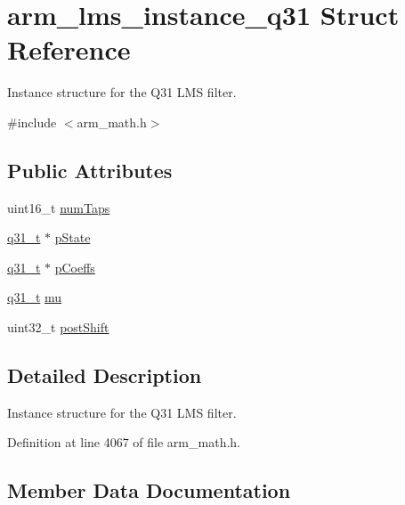 \hypertarget{structarm__lms__instance__q31}{}\section{arm\+\_\+lms\+\_\+instance\+\_\+q31 Struct Reference}
\label{structarm__lms__instance__q31}


Instance structure for the Q31 L\+MS filter.  




{\ttfamily \#include $<$arm\+\_\+math.\+h$>$}

\subsection*{Public Attributes}
\begin{DoxyCompactItemize}
\item 
uint16\+\_\+t \hyperlink{structarm__lms__instance__q31_ac0d84f7d054555931ef8a62511fbcb8a}{num\+Taps}
\item 
\hyperlink{arm__math_8h_adc89a3547f5324b7b3b95adec3806bc0}{q31\+\_\+t} $\ast$ \hyperlink{structarm__lms__instance__q31_a206d47b49de6f357f933ebe61520753c}{p\+State}
\item 
\hyperlink{arm__math_8h_adc89a3547f5324b7b3b95adec3806bc0}{q31\+\_\+t} $\ast$ \hyperlink{structarm__lms__instance__q31_a4afe56e991a5416adfd462aa88bda500}{p\+Coeffs}
\item 
\hyperlink{arm__math_8h_adc89a3547f5324b7b3b95adec3806bc0}{q31\+\_\+t} \hyperlink{structarm__lms__instance__q31_acb6ca9996b3c5f740d5d6c8e9f4f1d46}{mu}
\item 
uint32\+\_\+t \hyperlink{structarm__lms__instance__q31_a4705a8f0011bb9166e09bf5bd51e595e}{post\+Shift}
\end{DoxyCompactItemize}


\subsection{Detailed Description}
Instance structure for the Q31 L\+MS filter. 

Definition at line 4067 of file arm\+\_\+math.\+h.



\subsection{Member Data Documentation}
\mbox{\label{structarm__lms__instance__q31_acb6ca9996b3c5f740d5d6c8e9f4f1d46}} 
